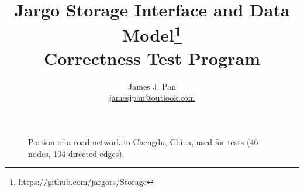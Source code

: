 \documentclass{article}
\title{Jargo Storage Interface
  and Data Model\footnote{\url{https://github.com/jargors/Storage}}\\
  \vspace{.5em}
  \Large{\textbf{Correctness Test Program}}}
\author{James J. Pan\\
  \small{\href{mailto:jamesjpan@outlook.com}{jamesjpan@outlook.com}}
}
\begin{document}
\maketitle
\pagestyle{noweb}

\begin{figure}[h]
\centering
{}
\caption{Portion of a road network in Chengdu, China,
    used for tests (46 nodes, 104 directed edges).}
\label{fig:road-network}
\end{figure}
\newpage

\tableofcontents
\end{document}
